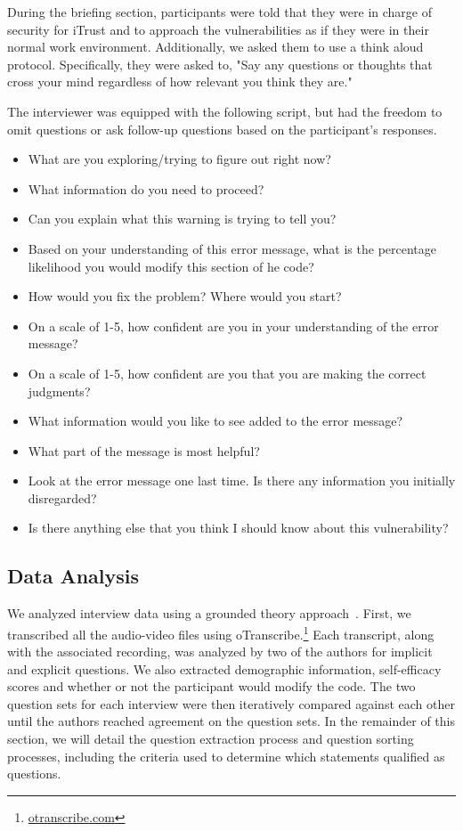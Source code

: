 \documentclass[conference]{IEEEtran}
\begin{document}
During the briefing section, participants were told that they were in charge of security for iTrust and to approach the vulnerabilities as if they were in their normal work environment.
Additionally, we asked them to use a think aloud protocol. Specifically, they were asked to, "Say any questions or thoughts that cross your mind regardless of how relevant you think they are."

The interviewer was equipped with the following script, but had the freedom to omit questions or ask follow-up questions based on the participant's responses.
\begin{itemize}
\item What are you exploring/trying to figure out right now?
\item What information do you need to proceed?
\item Can you explain what this warning is trying to tell you?
\item Based on your understanding of this error message, what is the percentage likelihood you would modify this section of he code?
\item How would you fix the problem? Where would you start?
\item On a scale of 1-5, how confident are you in your understanding of the error message?
\item On a scale of 1-5, how confident are you that you are making the correct judgments?
\item What information would you like to see added to the error message?
\item What part of the message is most helpful?
\item Look at the error message one last time. Is there any information you initially disregarded?
\item Is there anything else that you think I should know about this vulnerability?

\end{itemize}

\subsection{Data Analysis}
\label{dataAnalysis}
We analyzed interview data using a grounded theory approach~\cite{glaser2009discovery}. 
First, we transcribed all the audio-video files using oTranscribe.\footnote{\url{otranscribe.com}}
Each transcript, along with the associated recording, was analyzed by two of the authors for implicit and explicit questions. 
We also extracted demographic information, self-efficacy scores and whether or not the participant would modify the code. The two question sets for each interview were then iteratively compared against each other until the authors reached agreement on the question sets. 
In the remainder of this section, we will detail the question extraction process and question sorting processes, including the criteria used to determine which statements qualified as questions.
\end{document}
